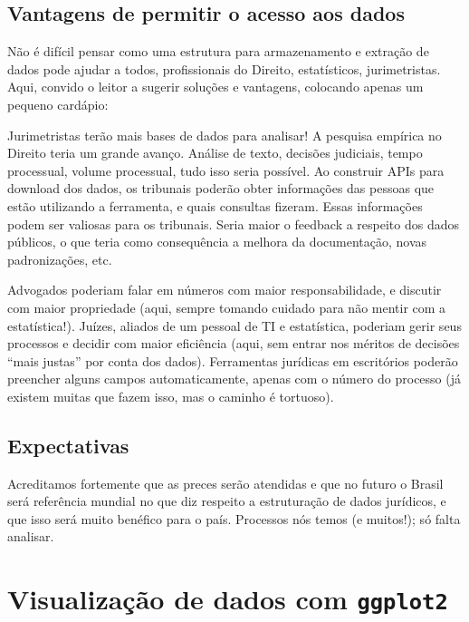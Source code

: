 \documentclass[]{book}
\begin{document}
\subsection{Vantagens de permitir o acesso aos
dados}\label{vantagens-de-permitir-o-acesso-aos-dados}

Não é difícil pensar como uma estrutura para armazenamento e extração de
dados pode ajudar a todos, profissionais do Direito, estatísticos,
jurimetristas. Aqui, convido o leitor a sugerir soluções e vantagens,
colocando apenas um pequeno cardápio:

Jurimetristas terão mais bases de dados para analisar! A pesquisa
empírica no Direito teria um grande avanço. Análise de texto, decisões
judiciais, tempo processual, volume processual, tudo isso seria
possível. Ao construir APIs para download dos dados, os tribunais
poderão obter informações das pessoas que estão utilizando a ferramenta,
e quais consultas fizeram. Essas informações podem ser valiosas para os
tribunais. Seria maior o feedback a respeito dos dados públicos, o que
teria como consequência a melhora da documentação, novas padronizações,
etc.

Advogados poderiam falar em números com maior responsabilidade, e
discutir com maior propriedade (aqui, sempre tomando cuidado para não
mentir com a estatística!). Juízes, aliados de um pessoal de TI e
estatística, poderiam gerir seus processos e decidir com maior
eficiência (aqui, sem entrar nos méritos de decisões ``mais justas'' por
conta dos dados). Ferramentas jurídicas em escritórios poderão preencher
alguns campos automaticamente, apenas com o número do processo (já
existem muitas que fazem isso, mas o caminho é tortuoso).

\subsection{Expectativas}\label{expectativas}

Acreditamos fortemente que as preces serão atendidas e que no futuro o
Brasil será referência mundial no que diz respeito a estruturação de
dados jurídicos, e que isso será muito benéfico para o país. Processos
nós temos (e muitos!); só falta analisar.

\section{\texorpdfstring{Visualização de dados com
\texttt{ggplot2}}{Visualização de dados com ggplot2}}\label{visualizacao-de-dados-com-ggplot2}
\end{document}
